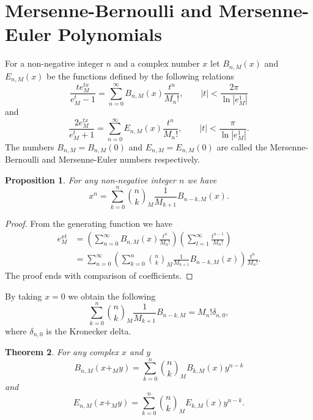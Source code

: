\documentclass[12pt, a4paper]{article}
\newtheorem{theorem}{Theorem}[section]
\newtheorem{proposition}[theorem]{Proposition}
\begin{document}
\section{Mersenne-Bernoulli and Mersenne-Euler Polynomials}
For a non-negative integer $n$ and a complex number $x$ let $B_{n,M}(x)$ and $E_{n,M}(x)$ be the functions defined by the following relations
\begin{equation} \label{egf:1}
\frac{te^{tx}_M}{e^t_M-1} = \sum_{n=0}^{\infty} B_{n,M}(x) \frac{t^n}{M_n!}, \hspace{2em}|t| < \frac{2\pi}{\ln |e_M^1|}
\end{equation}
and
\begin{equation}
\frac{2e^{tx}_M}{e^t_M+1} = \sum_{n=0}^{\infty} E_{n,M}(x) \frac{t^n}{M_n!}, \hspace{2em}|t| < \frac{\pi}{\ln |e_M^1|}.
\end{equation}
The numbers $B_{n,M} = B_{n,M}(0)$ and $E_{n,M} = E_{n,M}(0)$ are called the Mersenne-Bernoulli and Mersenne-Euler numbers respectively.
\begin{proposition}
For any non-negative integer $n$ we have
\begin{equation*}
x^n = \sum_{k=0}^{n}\binom{n}{k}_M\frac{1}{M_{k+1}}B_{n-k,M}(x).
\end{equation*}
\end{proposition}
\begin{proof}
From the generating function we have 
\begin{align*}
e^{xt}_M &= \left(\sum_{n=0}^{\infty}B_{n,M}(x)\frac{t^n}{M_n!}\right)\left(\sum_{l=1}^{\infty}\frac{t^{n-1}}{M_n!}\right)\\
&= \sum_{n=0}^{\infty}\left(\sum_{k=0}^{n}\binom{n}{k}_M\frac{1}{M_{k+1}}B_{n-k,M}(x)\right)\frac{t^n}{M_n!}.
\end{align*}
The proof ends with comparison of coefficients.
\end{proof}
By taking $x =0$ we obtain the following
\begin{equation} \label{BN: 1}
\sum_{k=0}^{n}\binom{n}{k}_M\frac{1}{M_{k+1}}B_{n-k,M} = M_n!\delta_{n,0},
\end{equation}
where $\delta_{n,0}$ is the Kronecker delta.
\begin{theorem} \label{TH: BE}
For any complex $x$ and $y$
\begin{equation*}
B_{n,M}(x+_My) = \sum_{k=0}^{n}\binom{n}{k}_MB_{k,M}(x)y^{n-k}
\end{equation*}
and
\begin{equation*}
E_{n,M}(x+_My) = \sum_{k=0}^{n}\binom{n}{k}_ME_{k,M}(x)y^{n-k}.
\end{equation*}
\end{theorem}
\end{document}
